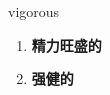 
\begin{frame}
{\huge vigorous}
\begin{center}
\begin{enumerate}\Large
  \item \textbf{精力旺盛的}
  \item \textbf{强健的}
\end{enumerate}
\end{center}
\end{frame}
